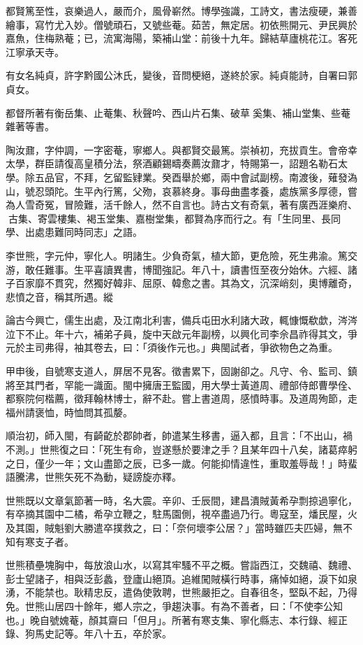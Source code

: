 \begin{pinyinscope}
都賢篤至性，哀樂過人，嚴而介，風骨嶄然。博學強識，工詩文，書法瘦硬，兼善繪事，寫竹尤入妙。僧號頑石，又號些菴。茹苦，無定居。初依熊開元、尹民興於嘉魚，住梅熟菴；已，流寓海陽，築補山堂：前後十九年。歸結草廬桃花江。客死江寧承天寺。

有女名純貞，許字黔國公沐氏，變後，音問梗絕，遂終於家。純貞能詩，自署曰郭貞女。

都督所著有衡岳集、止菴集、秋聲吟、西山片石集、破草奚集、補山堂集、些菴雜著等書。

陶汝鼐，字仲調，一字密菴，寧鄉人。與都賢交最篤。崇禎初，充拔貢生。會帝幸太學，群臣請復高皇積分法，祭酒顧錫疇奏薦汝鼐才，特賜第一，詔題名勒石太學。除五品官，不拜，乞留監肄業。癸酉舉於鄉，兩中會試副榜。南渡後，薙發溈山，號忍頭陀。生平內行篤，父歾，哀慕終身。事母曲盡孝養，處族黨多厚德，嘗為人雪奇冤，冒險難，活千餘人，然不自言也。詩古文有奇氣，著有廣西涯樂府、古集、寄雲樓集、褐玉堂集、嘉樹堂集，都賢為序而行之。有「生同里、長同學、出處患難同時同志」之語。

李世熊，字元仲，寧化人。明諸生。少負奇氣，植大節，更危險，死生弗渝。篤交游，敢任難事。生平喜讀異書，博聞強記。年八十，讀書恆至夜分始休。六經、諸子百家靡不貫究，然獨好韓非、屈原、韓愈之書。其為文，沉深峭刻，奧博離奇，悲憤之音，稱其所遇。縱

論古今興亡，儒生出處，及江南北利害，備兵屯田水利諸大政，輒慷慨欷歔，涔涔泣下不止。年十六，補弟子員，旋中天啟元年副榜，以興化司李佘昌祚得其文，爭元於主司弗得，袖其卷去，曰：「須後作元也。」典閩試者，爭欲物色之為重。

甲申後，自號寒支道人，屏居不見客。徵書累下，固謝卻之。凡守、令、監司、鎮將至其門者，罕能一識面。閩中擁唐王監國，用大學士黃道周、禮部侍郎曹學佺、都察院何楷薦，徵拜翰林博士，辭不赴。嘗上書道周，感憤時事。及道周殉節，走福州請褒恤，時恤問其孤嫠。

順治初，師入閩，有齮齕於郡帥者，帥遣某生移書，逼入都，且言：「不出山，禍不測。」世熊復之曰：「死生有命，豈遂懸於要津之手？且某年四十八矣，諸葛瘁躬之日，僅少一年；文山盡節之辰，已多一歲。何能抑情違性，重取羞辱哉！」時蜚語騰沸，世熊矢死不為動，疑謗旋亦釋。

世熊既以文章氣節著一時，名大震。辛卯、壬辰間，建昌潰賊黃希孕剽掠過寧化，有卒摘其園中二橘，希孕立鞭之，駐馬園側，視卒盡過乃行。粵寇至，燔民屋，火及其園，賊魁劉大勝遣卒撲救之，曰：「奈何壞李公居？」當時雖匹夫匹婦，無不知有寒支子者。

世熊積壘塊胸中，每放浪山水，以寫其牢騷不平之概。嘗詣西江，交魏禧、魏禮、彭士望諸子，相與泛彭蠡，登廬山絕頂。追維闖賊橫行時事，痛悼如絕，淚下如泉湧，不能禁也。耿精忠反，遣偽使敦聘，世熊嚴拒之。自春徂冬，堅臥不起，乃得免。世熊山居四十餘年，鄉人宗之，爭趨決事。有為不善者，曰：「不使李公知也。」晚自號媿菴，顏其齋曰「但月」。所著有寒支集、寧化縣志、本行錄、經正錄、狗馬史記等。年八十五，卒於家。


\end{pinyinscope}
